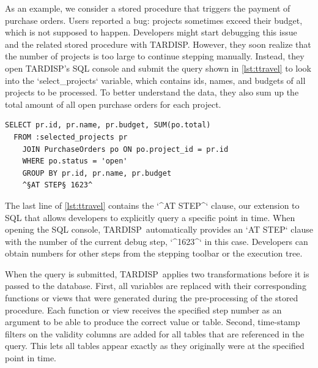 \documentclass[english,conference,final]{IEEEtran}
\newcommand{\todo}[2][]{\pdfmargincomment[author={#1}]{#2}}
\newcommand{\tool}{TAR\-DISP}
\begin{document}
As an example, we consider a stored procedure that triggers the payment of purchase orders.
Users reported a bug: projects sometimes exceed their budget, which is not supposed to happen.
Developers might start debugging this issue and the related stored procedure with \tool.
However, they soon realize that the number of projects is too large to continue stepping manually.
Instead, they open \tool's SQL console and submit the query shown in \cref{lst:ttravel} to look into the `select_projects` variable, which contains ids, names, and budgets of all projects to be processed.
To better understand the data, they also sum up the total amount of all open purchase orders for each project.


\begin{lstlisting}[language=HanaSQL,float,caption={Example for a time-travel query: select the current total of open orders for previously selected projects at step 1623 of the execution},label=lst:ttravel]
  SELECT pr.id, pr.name, pr.budget, SUM(po.total)
  FROM :selected_projects pr
	JOIN PurchaseOrders po ON po.project_id = pr.id
	WHERE po.status = 'open'
	GROUP BY pr.id, pr.name, pr.budget
	^§AT STEP§ 1623^
\end{lstlisting}

The last line of \cref{lst:ttravel} contains the `^AT STEP^` clause, our extension to SQL that allows developers to explicitly query a specific point in time.
When opening the SQL console, \tool\ automatically provides an `AT STEP` clause with the number of the current debug step, `^1623^` in this case.
Developers can obtain numbers for other steps from the stepping toolbar or the execution tree. 

When the query is submitted, \tool\ applies two transformations before it is passed to the database.
First, all variables are replaced with their corresponding functions or views that were generated during the pre-processing of the stored procedure.
Each function or view receives the specified step number as an argument to be able to produce the correct value or table.
Second, time-stamp filters on the validity columns are added for all tables that are referenced in the query. 
This lets all tables appear exactly as they originally were at the specified point in time.
\end{document}
